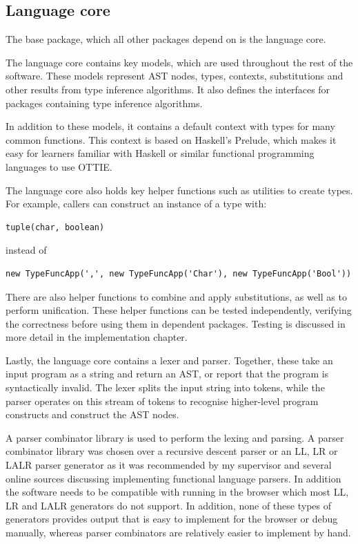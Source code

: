 \documentclass[a4paper,fleqn,oneside,12pt]{report}
\begin{document}
\subsection{Language core}\label{id:h.hggmfighusoc}

The base package, which all other packages depend on is the language core.

The language core contains key models, which are used throughout the rest of the software. These models represent AST nodes, types, contexts, substitutions and other results from type inference algorithms. It also defines the interfaces for packages containing type inference algorithms.

In addition to these models, it contains a default context with types for many common functions. This context is based on Haskell's Prelude, which makes it easy for learners familiar with Haskell or similar functional programming languages to use OTTIE.

The language core also holds key helper functions such as utilities to create types. For example, callers can construct an instance of a type with:

\begin{verbatim}
tuple(char, boolean)
\end{verbatim}
instead of

\begin{verbatim}
new TypeFuncApp(',', new TypeFuncApp('Char'), new TypeFuncApp('Bool'))
\end{verbatim}
There are also helper functions to combine and apply substitutions, as well as to perform unification. These helper functions can be tested independently, verifying the correctness before using them in dependent packages. Testing is discussed in more detail in the implementation chapter.

Lastly, the language core contains a lexer and parser. Together, these take an input program as a string and return an AST, or report that the program is syntactically invalid. The lexer splits the input string into tokens, while the parser operates on this stream of tokens to recognise higher-level program constructs and construct the AST nodes.

A parser combinator library is used to perform the lexing and parsing. A parser combinator library was chosen over a recursive descent parser or an LL, LR or LALR parser generator as it was recommended by my supervisor and several online sources discussing implementing functional language parsers. In addition the software needs to be compatible with running in the browser which most LL, LR and LALR generators do not support. In addition, none of these types of generators provides output that is easy to implement for the browser or debug manually, whereas parser combinators are relatively easier to implement by hand.
\end{document}
